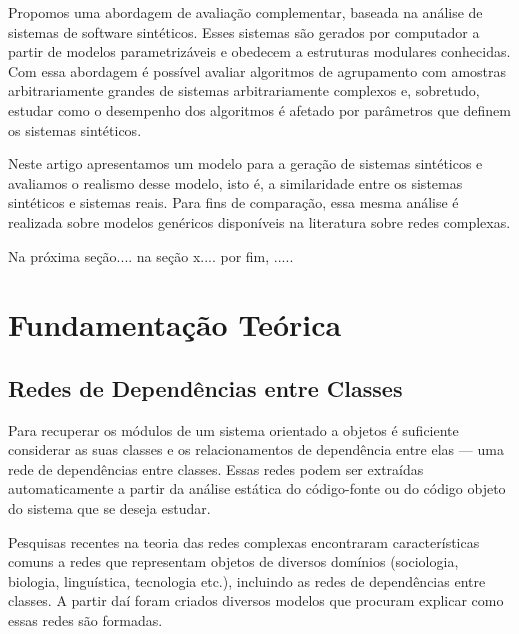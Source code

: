 \documentclass{acm_proc_article-sp}
\begin{document}


Propomos uma abordagem de avaliação complementar, baseada na análise de sistemas de software sintéticos. Esses sistemas são gerados por computador a partir de modelos parametrizáveis e obedecem a estruturas modulares conhecidas. Com essa abordagem é possível avaliar algoritmos de agrupamento com amostras arbitrariamente grandes de sistemas arbitrariamente complexos e, sobretudo, estudar como o desempenho dos algoritmos é afetado por parâmetros que definem os sistemas sintéticos.

Neste artigo apresentamos um modelo para a geração de sistemas sintéticos e avaliamos o realismo desse modelo, isto é, a similaridade entre os sistemas sintéticos e sistemas reais. Para fins de comparação, essa mesma análise é realizada sobre modelos genéricos disponíveis na literatura sobre redes complexas.

Na próxima seção.... na seção x.... por fim, .....

\section{Fundamentação Teórica}

\subsection{Redes de Dependências entre Classes}

Para recuperar os módulos de um sistema orientado a objetos é suficiente considerar as suas classes e os relacionamentos de dependência entre elas --- uma rede de dependências entre classes. Essas redes podem ser extraídas automaticamente a partir da análise estática do código-fonte ou do código objeto do sistema que se deseja estudar.

Pesquisas recentes na teoria das redes complexas encontraram características comuns a redes que representam objetos de diversos domínios (sociologia, biologia, linguística, tecnologia etc.), incluindo as redes de dependências entre classes. A partir daí foram criados diversos modelos que procuram explicar como essas redes são formadas.
\end{document}

